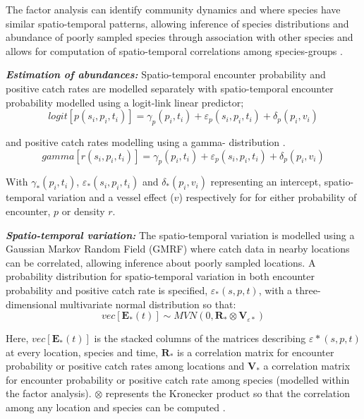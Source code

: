 \documentclass{nature}
\begin{document}
\begin{linenumbers}
The factor analysis can identify community dynamics and where species have
similar spatio-temporal patterns, allowing inference of species distributions
and abundance of poorly sampled species through association with other species
and allows for computation of spatio-temporal correlations among species-groups
\cite{Thorson2016b}.

\textbf{\textit{Estimation of abundances:}} Spatio-temporal encounter
probability and positive catch rates are modelled separately with
spatio-temporal encounter probability modelled using a logit-link linear
predictor;
		\begin{equation}
			logit[p(s_{i},p_{i},t_{i})] = \gamma_{p}(p_{i},t_{i}) +
			\varepsilon_{p}(s_{i},p_{i},t_{i}) + \delta_{p}(p_{i},
			v_{i})
		\end{equation}

and positive catch rates modelling using a gamma- distribution \cite{Thorson2015a}.  
		\begin{equation}
			gamma[r(s_{i},p_{i},t_{i})] = \gamma_{p}(p_{i},t_{i}) +
			\varepsilon_{p}(s_{i},p_{i},t_{i}) + \delta_{p}(p_{i},
			v_{i})
		\end{equation}

With $\gamma_{*}(p_{i},t_{i})$, $\varepsilon_{*}(s_{i},p_{i},t_{i})$ and
$\delta_{*}(p_{i}, v_{i})$ representing an intercept, spatio-temporal variation
and a vessel effect ($v$) respectively for for either probability of encounter,
$p$ or density $r$.

\textbf{\textit{Spatio-temporal variation:}} The spatio-temporal variation is
modelled using a Gaussian Markov Random Field (GMRF) where catch data in nearby
locations can be correlated, allowing inference about poorly sampled locations.
A probability distribution for spatio-temporal variation in both encounter
probability and positive catch rate is specified, $\varepsilon_{*}(s,p,t)$,
with a three-dimensional multivariate normal distribution so that:
	\begin{equation}
		vec[\mathbf{E}_{*}(t)] \sim MVN(0,\mathbf{R}_{*} \otimes
		\mathbf{V}_{{\varepsilon}{*}})
	\end{equation}

Here, $vec[\mathbf{E}_{*}(t)]$ is the stacked columns of the matrices
describing $\varepsilon{*}(s,p,t)$ at every location, species and time,
$\mathbf{R}_{*}$ is a correlation matrix for encounter probability or positive
catch rates among locations and $\mathbf{V}_{*}$ a correlation matrix for
encounter probability or positive catch rate among species (modelled within the
factor analysis). $\otimes$ represents the Kronecker product so that the
correlation among any location and species can be computed \cite{Thorson2017}.
		

\end{linenumbers}
\end{document}
